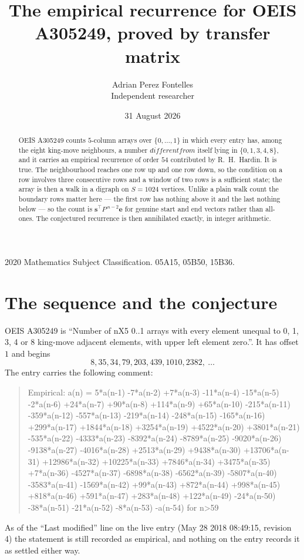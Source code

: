 \documentclass[11pt,a4paper]{article}
\title{The empirical recurrence for OEIS A305249, proved by transfer matrix}
\author{Adrian Perez Fontelles\\ \small Independent researcher}
\date{31 August 2026}
\theoremstyle{plain}
\theoremstyle{definition}
\begin{document}
\maketitle

\begin{abstract}
OEIS A305249 counts $5$-column arrays over $\{0,\dots,1\}$ in which every entry has,
among the eight king-move neighbours, a number $different from$ itself lying in $\{0,1,3,4,8\}$, and it carries an empirical
recurrence of order $54$ contributed by R.~H.~Hardin. It is true. The neighbourhood
reaches one row up and one row down, so the condition on a row involves three consecutive
rows and a window of two rows is a sufficient state; the array is then a walk in a digraph
on $S=1024$ vertices. Unlike a plain walk count the boundary rows matter here --- the first
row has nothing above it and the last nothing below --- so the count is
$\mathbf{s}^{\!\top}P^{\,n-2}\mathbf{e}$ for genuine start and end vectors rather than
all-ones. The conjectured recurrence is then annihilated exactly, in integer arithmetic.
\end{abstract}

\noindent\small 2020 Mathematics Subject Classification. 05A15, 05B50, 15B36.\normalsize

\section{The sequence and the conjecture}

OEIS A305249 is ``Number of nX5 0..1 arrays with every element unequal to 0, 1, 3, 4 or 8 king-move adjacent elements, with upper left element zero.''. It has offset
$1$ and begins
\[
8, 35, 34, 79, 203, 439, 1010, 2382,\ \dots
\]
The entry carries the following comment:
\begin{quote}\small
Empirical: a(n) = 5*a(n-1) -7*a(n-2) +7*a(n-3) -11*a(n-4) -15*a(n-5) -2*a(n-6) +24*a(n-7) +90*a(n-8) +114*a(n-9) +65*a(n-10) -215*a(n-11) -359*a(n-12) -557*a(n-13) -219*a(n-14) -248*a(n-15) -165*a(n-16) +299*a(n-17) +1844*a(n-18) +3254*a(n-19) +4522*a(n-20) +3801*a(n-21) -535*a(n-22) -4333*a(n-23) -8392*a(n-24) -8789*a(n-25) -9020*a(n-26) -9138*a(n-27) -4016*a(n-28) +2513*a(n-29) +9438*a(n-30) +13706*a(n-31) +12986*a(n-32) +10225*a(n-33) +7846*a(n-34) +3475*a(n-35) +7*a(n-36) -4527*a(n-37) -6898*a(n-38) -6562*a(n-39) -5807*a(n-40) -3583*a(n-41) -1569*a(n-42) +99*a(n-43) +872*a(n-44) +998*a(n-45) +818*a(n-46) +591*a(n-47) +283*a(n-48) +122*a(n-49) -24*a(n-50) -38*a(n-51) -21*a(n-52) -8*a(n-53) -a(n-54) for n>59
\end{quote}
As of the ``Last modified'' line on the live entry (May 28 2018 08:49:15, revision
4) the statement is still recorded as empirical, and nothing on the entry
records it as settled either way.
\end{document}
